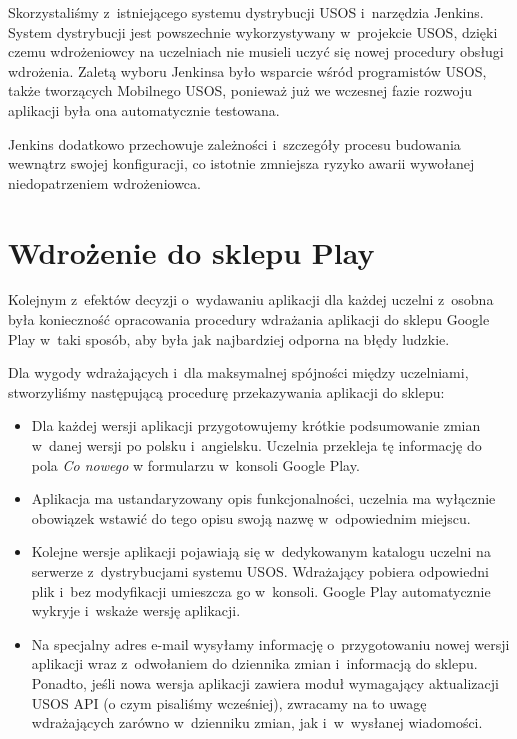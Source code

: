 \documentclass{pracamgr}
\begin{document}
Skorzystaliśmy z~istniejącego systemu dystrybucji USOS i~narzędzia Jenkins. System dystrybucji
jest powszechnie wykorzystywany w~projekcie USOS, dzięki czemu wdrożeniowcy na uczelniach
nie musieli uczyć się nowej procedury obsługi wdrożenia.
Zaletą wyboru Jenkinsa było wsparcie wśród programistów USOS, także tworzących
Mobilnego USOS, ponieważ już we wczesnej
fazie rozwoju aplikacji była ona automatycznie testowana.

Jenkins dodatkowo przechowuje zależności i~szczegóły procesu budowania wewnątrz swojej konfiguracji, co istotnie
zmniejsza ryzyko awarii wywołanej niedopatrzeniem wdrożeniowca.

\section{Wdrożenie do sklepu Play}

Kolejnym z~efektów decyzji o~wydawaniu aplikacji dla każdej uczelni z~osobna była
konieczność opracowania procedury wdrażania aplikacji do sklepu Google Play w~taki
sposób, aby była jak najbardziej odporna na błędy ludzkie.

Dla wygody wdrażających i~dla maksymalnej spójności między uczelniami, stworzyliśmy
następującą procedurę przekazywania aplikacji do sklepu:
\begin{itemize}
	\item Dla każdej wersji aplikacji przygotowujemy krótkie podsumowanie zmian
	w~danej wersji po polsku i~angielsku.
	Uczelnia przekleja tę informację do pola \textit{Co nowego} w formularzu w~konsoli Google Play.
	\item Aplikacja ma ustandaryzowany opis funkcjonalności, uczelnia ma wyłącznie
	obowiązek wstawić do tego opisu swoją nazwę w~odpowiednim miejscu.
	\item Kolejne wersje aplikacji pojawiają się w~dedykowanym katalogu uczelni na
	serwerze z~dystrybucjami systemu USOS. Wdrażający pobiera odpowiedni plik i~bez
	modyfikacji umieszcza go w~konsoli. Google Play automatycznie wykryje i~wskaże
	wersję aplikacji.
	\item Na specjalny adres e-mail wysyłamy informację o~przygotowaniu nowej wersji
	aplikacji wraz z~odwołaniem do dziennika zmian i~informacją do sklepu. Ponadto,
	jeśli nowa wersja aplikacji zawiera moduł wymagający aktualizacji USOS API
	(o czym pisaliśmy wcześniej), zwracamy na to uwagę wdrażających zarówno w~dzienniku
	zmian, jak i~w~wysłanej wiadomości.
\end{itemize}
\end{document}
